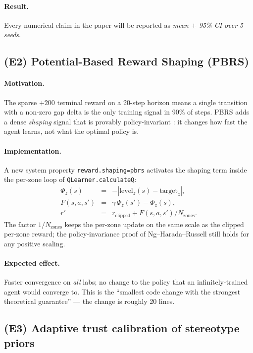 \documentclass[conference]{IEEEtran}
\begin{document}
\paragraph{Result.} Every numerical claim in the paper will be
reported as \emph{mean $\pm$ 95\% CI over 5 seeds}.

\subsection{(E2) Potential-Based Reward Shaping (PBRS)}
\label{sec:ext-pbrs}

\paragraph{Motivation.} The sparse $+200$ terminal reward on a 20-step
horizon means a single transition with a non-zero gap delta is the
only training signal in 90\% of steps. PBRS adds a dense \emph{shaping}
signal that is provably policy-invariant
\cite{ng1999policy}: it changes how fast the agent learns, not what
the optimal policy is.

\paragraph{Implementation.}
A new system property \verb|reward.shaping=pbrs| activates the
shaping term inside the per-zone loop of
\verb|QLearner.calculateQ|:
\begin{eqnarray*}
\Phi_z(s)  &=& -|\text{level}_z(s) - \text{target}_z|,\\
F(s,a,s')  &=& \gamma\,\Phi_z(s') - \Phi_z(s),\\
r'         &=& r_{\text{clipped}} + F(s,a,s')/N_{\text{zones}}.
\end{eqnarray*}
The factor $1/N_{\text{zones}}$ keeps the per-zone update on the same
scale as the clipped per-zone reward; the policy-invariance proof of
Ng--Harada--Russell still holds for any positive scaling.

\paragraph{Expected effect.} Faster convergence on \emph{all} labs;
no change to the policy that an infinitely-trained agent would
converge to. This is the ``smallest code change with the strongest
theoretical guarantee'' --- the change is roughly 20 lines.

\subsection{(E3) Adaptive trust calibration of stereotype priors}
\label{sec:ext-trust}
\end{document}

